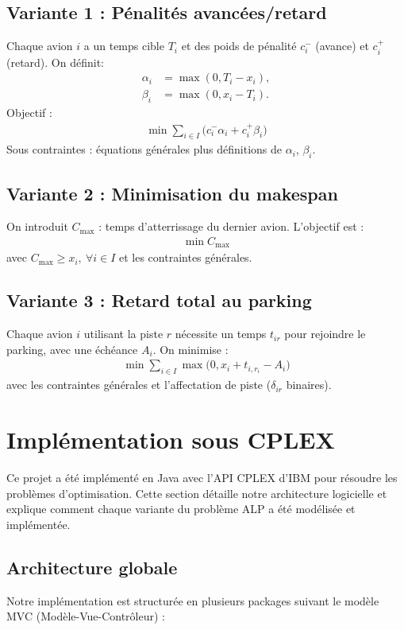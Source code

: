 \documentclass[a4paper,12pt]{report}
\begin{document}
\subsection{Variante 1 : Pénalités avancées/retard}
Chaque avion $i$ a un temps cible $T_i$ et des poids de pénalité $c_i^-$ (avance) et $c_i^+$ (retard). On définit:
\begin{align*}
  \alpha_i &= \max(0, T_i - x_i), \\
  \beta_i  &= \max(0, x_i - T_i).
\end{align*}
Objectif :
\begin{align}
  \min \sum_{i\in I} \bigl(c_i^-\alpha_i + c_i^+\beta_i\bigr)
\end{align}
Sous contraintes : équations générales plus définitions de $\alpha_i$, $\beta_i$.

\subsection{Variante 2 : Minimisation du makespan}
On introduit $C_{\max}$ : temps d'atterrissage du dernier avion. L'objectif est :
\begin{align}
  \min C_{\max}
\end{align}
avec $C_{\max}\ge x_i,\ \forall i\in I$ et les contraintes générales.

\subsection{Variante 3 : Retard total au parking}
Chaque avion $i$ utilisant la piste $r$ nécessite un temps $t_{ir}$ pour rejoindre le parking, avec une échéance $A_i$. On minimise :
\begin{align}
  \min \sum_{i\in I} \max\bigl(0, x_i + t_{i,r_i} - A_i\bigr)
\end{align}
avec les contraintes générales et l'affectation de piste ($\delta_{ir}$ binaires).

\section{Implémentation sous CPLEX}
Ce projet a été implémenté en Java avec l'API CPLEX d'IBM pour résoudre les problèmes d'optimisation. Cette section détaille notre architecture logicielle et explique comment chaque variante du problème ALP a été modélisée et implémentée.

\subsection{Architecture globale}
Notre implémentation est structurée en plusieurs packages suivant le modèle MVC (Modèle-Vue-Contrôleur) :
\end{document}
